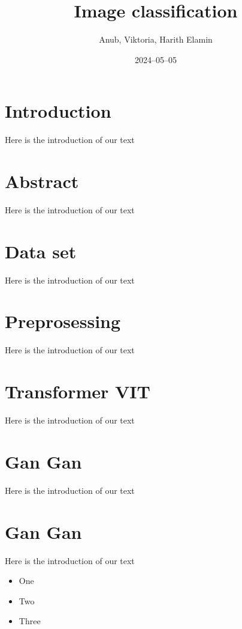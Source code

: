 \documentclass[12pt]{article}
\title{Image classification}
\author{Anub, Viktoria, Harith Elamin}
\date{2024–05–05}
\begin{document}
\maketitle

\section{Introduction}

Here is the introduction of our text

\section{Abstract}

Here is the introduction of our text

\section{Data set}

Here is the introduction of our text

\section{Preprosessing}

Here is the introduction of our text

\section{Transformer VIT}

Here is the introduction of our text

\section{Gan Gan}

Here is the introduction of our text

\section{Gan Gan}

Here is the introduction of our text

\begin{itemize}

\item One

\item Two

\item Three

\end{itemize}
\end{document}
